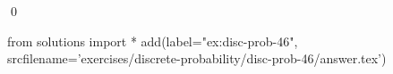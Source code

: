 
\begin{ex} 
  \label{ex:disc-prob-46}
  
  \qed
\end{ex} 
\begin{python0}
from solutions import *
add(label="ex:disc-prob-46",
    srcfilename='exercises/discrete-probability/disc-prob-46/answer.tex') 
\end{python0}
